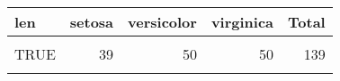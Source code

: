 \begin{table}[H]
\centering\begingroup\fontsize{10}{12}\selectfont

\begin{tabular}{>{\raggedright\arraybackslash}p{1in}rrrr}
\toprule
len & setosa & versicolor & virginica & Total\\
\midrule
\cellcolor{gray!6}{FALSE} & \cellcolor{gray!6}{11} & \cellcolor{gray!6}{0} & \cellcolor{gray!6}{0} & \cellcolor{gray!6}{11}\\
TRUE & 39 & 50 & 50 & 139\\
\cellcolor{gray!6}{Total} & \cellcolor{gray!6}{50} & \cellcolor{gray!6}{50} & \cellcolor{gray!6}{50} & \cellcolor{gray!6}{150}\\
\bottomrule
\end{tabular}
\endgroup{}
\end{table}
